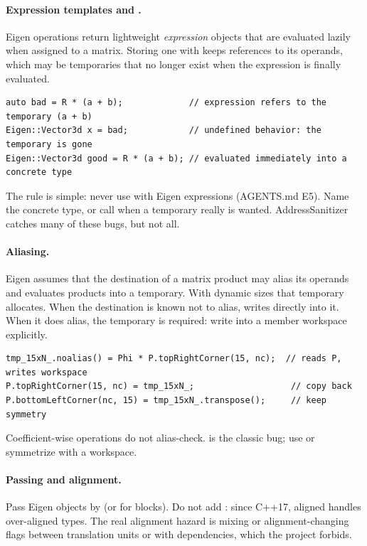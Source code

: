 \paragraph{Expression templates and .} Eigen operations return lightweight \emph{expression} objects that are evaluated
lazily when assigned to a matrix. Storing one with  keeps references to its operands, which may be temporaries that no
longer exist when the expression is finally evaluated.

\begin{lstlisting}
auto bad = R * (a + b);             // expression refers to the temporary (a + b)
Eigen::Vector3d x = bad;            // undefined behavior: the temporary is gone
Eigen::Vector3d good = R * (a + b); // evaluated immediately into a concrete type
\end{lstlisting}

The rule is simple: never use  with Eigen expressions (AGENTS.md E5). Name the concrete type, or call  when a
temporary really is wanted. AddressSanitizer catches many of these bugs, but not all.

\paragraph{Aliasing.} Eigen assumes that the destination of a matrix product may alias its operands and evaluates products into a
temporary. With dynamic sizes that temporary allocates. When the destination is known not to alias,  writes directly
into it. When it does alias, the temporary is required: write into a member workspace explicitly.

\begin{lstlisting}
tmp_15xN_.noalias() = Phi * P.topRightCorner(15, nc);  // reads P, writes workspace
P.topRightCorner(15, nc) = tmp_15xN_;                   // copy back
P.bottomLeftCorner(nc, 15) = tmp_15xN_.transpose();     // keep symmetry
\end{lstlisting}

Coefficient-wise operations do not alias-check.  is the classic bug; use  or symmetrize
with a workspace.

\paragraph{Passing and alignment.} Pass Eigen objects by  (or  for blocks). Do not add
: since C++17, aligned  handles over-aligned types. The real alignment hazard is mixing
 or alignment-changing flags between translation units or with dependencies, which the project forbids.

